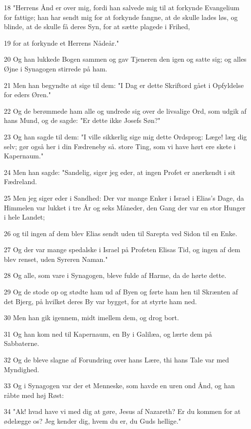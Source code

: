 \par 18 "Herrens Ånd er over mig, fordi han salvede mig til at forkynde Evangelium for fattige; han har sendt mig for at forkynde fangne, at de skulle lades løs, og blinde, at de skulle få deres Syn, for at sætte plagede i Frihed,
\par 19 for at forkynde et Herrens Nådeår."
\par 20 Og han lukkede Bogen sammen og gav Tjeneren den igen og satte sig; og alles Øjne i Synagogen stirrede på ham.
\par 21 Men han begyndte at sige til dem: "I Dag er dette Skriftord gået i Opfyldelse for eders Øren."
\par 22 Og de berømmede ham alle og undrede sig over de livsalige Ord, som udgik af hans Mund, og de sagde: "Er dette ikke Josefs Søn?"
\par 23 Og han sagde til dem: "I ville sikkerlig sige mig dette Ordsprog: Læge! læg dig selv; gør også her i din Fædreneby så. store Ting, som vi have hørt ere skete i Kapernaum."
\par 24 Men han sagde: "Sandelig, siger jeg eder, at ingen Profet er anerkendt i sit Fædreland.
\par 25 Men jeg siger eder i Sandhed: Der var mange Enker i Israel i Elias's Dage, da Himmelen var lukket i tre År og seks Måneder, den Gang der var en stor Hunger i hele Landet;
\par 26 og til ingen af dem blev Elias sendt uden til Sarepta ved Sidon til en Enke.
\par 27 Og der var mange spedalske i Israel på Profeten Elisas Tid, og ingen af dem blev renset, uden Syreren Naman."
\par 28 Og alle, som vare i Synagogen, bleve fulde af Harme, da de hørte dette.
\par 29 Og de stode op og stødte ham ud af Byen og førte ham hen til Skrænten af det Bjerg, på hvilket deres By var bygget, for at styrte ham ned.
\par 30 Men han gik igennem, midt imellem dem, og drog bort.
\par 31 Og han kom ned til Kapernaum, en By i Galilæa, og lærte dem på Sabbaterne.
\par 32 Og de bleve slagne af Forundring over hans Lære, thi hans Tale var med Myndighed.
\par 33 Og i Synagogen var der et Menneske, som havde en uren ond Ånd, og han råbte med høj Røst:
\par 34 "Ak! hvad have vi med dig at gøre, Jesus af Nazareth? Er du kommen for at ødelægge os? Jeg kender dig, hvem du er, du Guds hellige."
